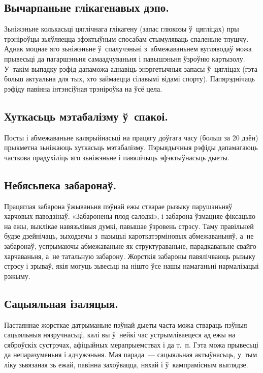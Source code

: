 \subsection{Вычарпаньне глікагенавых дэпо.}
Зьніжэньне колькасьці цяглічнага глікагену (запас глюкозы ў~цягліцах) пры трэніроўцы зьяўляецца эфэктыўным спосабам стымуляваць спаленьне тлушчу. Аднак моцнае яго зьніжэньне ў~спалучэньні з~абмежаваньнем вугляводаў можа прывесьці да пагаршэньня самаадчуваньня і павышэньня ўзроўню картызолу. У~такім выпадку рэфід дапаможа аднавіць энэргетычныя запасы ў~цягліцах (гэта больш актуальна для тых, хто займаецца сілавымі відамі спорту). Папярэднічаць рэфіду павінна інтэнсіўная трэніроўка на ўсё цела.

\subsection{Хуткасьць мэтабалізму ў~спакоі.}
Посты і абмежаваньне калярыйнасьці на працягу доўгага часу (больш за 20 дзён) прыкметна зьніжаюць хуткасьць мэтабалізму. Пэрыядычныя рэфіды дапамагаюць часткова прадухіліць яго зьніжэньне і павялічыць эфэктыўнасьць дыеты.

\subsection{Небясьпека забаронаў.}
Працяглая забарона ўжываньня пэўнай ежы стварае рызыку парушэньняў харчовых паводзінаў. «Забаронены плод салодкі», і забарона ўзмацняе фіксацыю на ежы, выклікае навязьлівыя думкі, павышае ўзровень стрэсу. Таму правільней будзе дзейнічаць, зыходзячы з~пазыцыі кароткатэрміновых абмежаваньняў, а~не забаронаў, успрымаючы абмежаваньне як структураваньне, парадкаваньне свайго харчаваньня, а~не татальную забарону. Жорсткія забароны павялічваюць рызыку стрэсу і зрываў, якія могуць зьвесьці на нішто ўсе нашы намаганьні нармалізацыі рэжыму.


\subsection{Сацыяльная ізаляцыя.}
Пастаяннае жорсткае датрыманьне пэўнай дыеты часта можа ствараць пэўныя сацыяльныя нязручнасьці, калі вы ў~нейкі час устрымліваецеся ад ежы на сяброўскіх сустрэчах, афіцыйных мерапрыемствах і да т.~п. Гэта можа прывесьці да непаразуменьня і адчужэньня. Мая парада~--- сацыяльная актыўнасьць, у~тым ліку зьвязаная зь ежай, павінна захоўвацца, няхай і ў~кампрамісным выглядзе.

